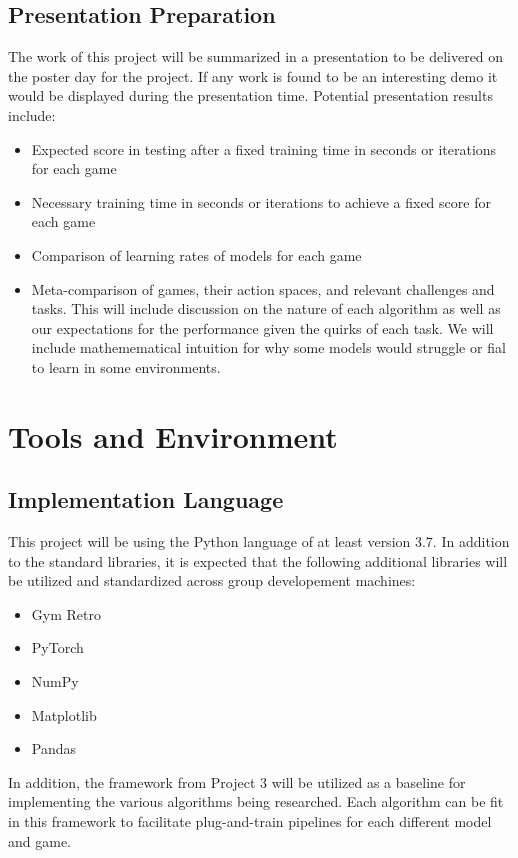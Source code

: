 \documentclass[conference]{IEEEtran}
\begin{document}
\subsection{Presentation Preparation}
The work of this project will be summarized in a presentation to be delivered on the poster day for the project.
If any work is found to be an interesting demo it would be displayed during the presentation time. Potential presentation results include:
\begin{itemize}
    \item Expected score in testing after a fixed training time in seconds or iterations for each game
    \item Necessary training time in seconds or iterations to achieve a fixed score for each game
    \item Comparison of learning rates of models for each game
    \item Meta-comparison of games, their action spaces, and relevant challenges and tasks. This will include discussion on the nature of each algorithm as well as our expectations for the performance given the quirks of each task. We will include mathemematical intuition for why some models would struggle or fial to learn in some environments.
\end{itemize}

\section{Tools and Environment}

\subsection{Implementation Language}
This project will be using the Python language of at least version 3.7.
In addition to the standard libraries, it is expected that the following additional libraries will be utilized and standardized across group developement machines:
 
\begin{itemize}
    \item Gym Retro \cite{nichol2018retro}
    \item PyTorch
    \item NumPy
    \item Matplotlib
    \item Pandas
\end{itemize}

In addition, the framework from Project 3 will be utilized as a baseline for implementing the various algorithms being researched. Each algorithm can be fit in this framework to facilitate plug-and-train pipelines for each different model and game.
\end{document}
